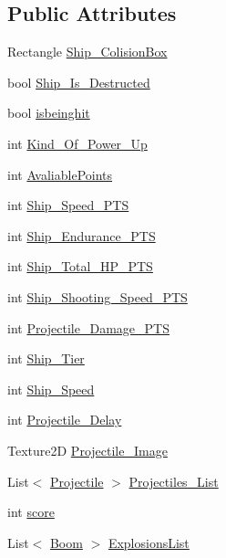 \subsection*{Public Attributes}
\begin{DoxyCompactItemize}
\item 
Rectangle \hyperlink{class_t_d_j___gliese_1_1_ship_ac94ff68060753b5a57183a414e10198c}{Ship\+\_\+\+Colision\+Box}
\item 
bool \hyperlink{class_t_d_j___gliese_1_1_ship_ab04d95577b2e9d59038beb15d4c44517}{Ship\+\_\+\+Is\+\_\+\+Destructed}
\item 
bool \hyperlink{class_t_d_j___gliese_1_1_ship_a6fd70556744e25e1743cc27f566018cd}{isbeinghit}
\item 
int \hyperlink{class_t_d_j___gliese_1_1_ship_a944a147b9a2e0391499617014f1a79a9}{Kind\+\_\+\+Of\+\_\+\+Power\+\_\+\+Up}
\item 
int \hyperlink{class_t_d_j___gliese_1_1_ship_a5a045b903027b805f2bf6893cce33784}{Avaliable\+Points}
\item 
int \hyperlink{class_t_d_j___gliese_1_1_ship_aed7ff40de6c54938a7589595379b1195}{Ship\+\_\+\+Speed\+\_\+\+P\+TS}
\item 
int \hyperlink{class_t_d_j___gliese_1_1_ship_a12a03cfeace42db0d257ce4f75c456f6}{Ship\+\_\+\+Endurance\+\_\+\+P\+TS}
\item 
int \hyperlink{class_t_d_j___gliese_1_1_ship_a145313c1949b730fc835fd7325b375d9}{Ship\+\_\+\+Total\+\_\+\+H\+P\+\_\+\+P\+TS}
\item 
int \hyperlink{class_t_d_j___gliese_1_1_ship_abb4db4b5321a9cf19f9dbedc92a34113}{Ship\+\_\+\+Shooting\+\_\+\+Speed\+\_\+\+P\+TS}
\item 
int \hyperlink{class_t_d_j___gliese_1_1_ship_adc2a27973f237ed489ce8002b87055f4}{Projectile\+\_\+\+Damage\+\_\+\+P\+TS}
\item 
int \hyperlink{class_t_d_j___gliese_1_1_ship_a3c547516f746218184f5752bb2126ac5}{Ship\+\_\+\+Tier}
\item 
int \hyperlink{class_t_d_j___gliese_1_1_ship_a4dfc99b5768e2c500e2f530ce65c3a65}{Ship\+\_\+\+Speed}
\item 
int \hyperlink{class_t_d_j___gliese_1_1_ship_a714c6a21bfad19da1f4f8ab388b0793c}{Projectile\+\_\+\+Delay}
\item 
Texture2D \hyperlink{class_t_d_j___gliese_1_1_ship_a7c579568b281500132258c25b8dc41f6}{Projectile\+\_\+\+Image}
\item 
List$<$ \hyperlink{class_t_d_j___gliese_1_1_projectile}{Projectile} $>$ \hyperlink{class_t_d_j___gliese_1_1_ship_aa4dd7af04e2eba843ee65a5890a6f683}{Projectiles\+\_\+\+List}
\item 
int \hyperlink{class_t_d_j___gliese_1_1_ship_a9b8a46c11a735285804f87466ca1641c}{score}
\item 
List$<$ \hyperlink{class_t_d_j___gliese_1_1_content_1_1_boom}{Boom} $>$ \hyperlink{class_t_d_j___gliese_1_1_ship_a88182145d60126a7a22abfe10232b25d}{Explosions\+List}
\end{DoxyCompactItemize}



